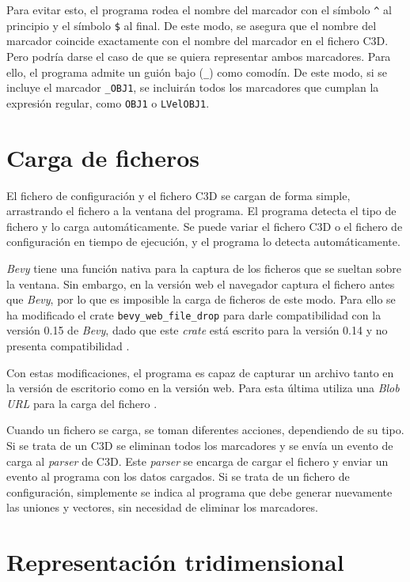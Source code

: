 Para evitar esto, el programa rodea el nombre del marcador con el símbolo \texttt{\^} al principio y el símbolo \texttt{\$} al final. De este modo, se asegura que el nombre del marcador coincide exactamente con el nombre del marcador en el fichero \ac{C3D}. Pero podría darse el caso de que se quiera representar ambos marcadores. Para ello, el programa admite un guión bajo (\texttt{\_}) como comodín. De este modo, si se incluye el marcador \texttt{\_OBJ1}, se incluirán todos los marcadores que cumplan la expresión regular, como \texttt{OBJ1} o \texttt{LVelOBJ1}. 

\section{Carga de ficheros}

El fichero de configuración y el fichero \ac{C3D} se cargan de forma simple, arrastrando el fichero a la ventana del programa. El programa detecta el tipo de fichero y lo carga automáticamente. Se puede variar el fichero \ac{C3D} o el fichero de configuración en tiempo de ejecución, y el programa lo detecta automáticamente.

\textit{Bevy} tiene una función nativa para la captura de los ficheros que se sueltan sobre la ventana. Sin embargo, en la versión web el navegador captura el fichero antes que \textit{Bevy}, por lo que es imposible la carga de ficheros de este modo. Para ello se ha modificado el crate \texttt{bevy\_web\_file\_drop} para darle compatibilidad con la versión 0.15 de \textit{Bevy}, dado que este \textit{crate} está escrito para la versión 0.14 y no presenta compatibilidad \autocite{Bevy_web_file_dropCratesioRust2024}.

Con estas modificaciones, el programa es capaz de capturar un archivo tanto en la versión de escritorio como en la versión web. Para esta última utiliza una \textit{Blob URL} para la carga del fichero \autocite{AnswerWhatBlob2015,FileAPI}.

Cuando un fichero se carga, se toman diferentes acciones, dependiendo de su tipo. Si se trata de un \ac{C3D} se eliminan todos los marcadores y se envía un evento de carga al \textit{parser} de \ac{C3D}. Este \textit{parser} se encarga de cargar el fichero y enviar un evento al programa con los datos cargados. Si se trata de un fichero de configuración, simplemente se indica al programa que debe generar nuevamente las uniones y vectores, sin necesidad de eliminar los marcadores. 

\section{Representación tridimensional} \label{sec:representacion-3d}

